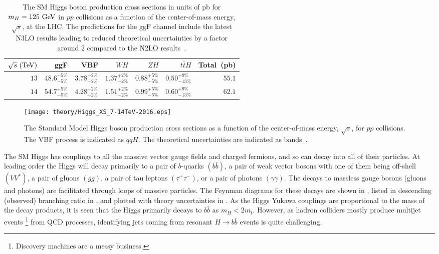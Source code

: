 \begin{table}[htpb]
 \centering
 \caption[The Standard Model Higgs boson production cross sections in units of pb for $m_{H}=125~\GeV$ in $pp$ collisions as a function of the center-of-mass energy, $\sqrt{s}$, at the LHC.]{%
  The SM Higgs boson production cross sections in units of pb for $m_{H}=125~\GeV$ in $pp$ collisions as a function of the center-of-mass energy, $\sqrt{s}$, at the LHC.
  The predictions for the ggF channel include the latest N3LO results leading to reduced theoretical uncertainties by a factor around 2 compared to the N2LO results~\cite{PDG2018:Ch11}.}
 \begin{tabular}{@{}rrrrrrr@{}} \toprule
  $\sqrt{s}~(\mathrm{TeV})$ & ggF                  & VBF                  & $WH$                 & $ZH$                 & $t\bar{t}H$           & Total~(pb) \\ \midrule
  $13$              & $48.6_{-5\%}^{+5\%}$ & $3.78_{-2\%}^{+2\%}$ & $1.37_{-2\%}^{+2\%}$ & $0.88_{-5\%}^{+5\%}$ & $0.50_{-13\%}^{+9\%}$ & $55.1$     \\
  \addlinespace[0.3em]
  $14$              & $54.7_{-5\%}^{+5\%}$ & $4.28_{-2\%}^{+2\%}$ & $1.51_{-2\%}^{+2\%}$ & $0.99_{-5\%}^{+5\%}$ & $0.60_{-13\%}^{+9\%}$ & $62.1$     \\
  \bottomrule
 \end{tabular}\label{table:Higgs_production_cross_section}%
\end{table}

\begin{figure}
 \centering
 \texttt{[image: theory/Higgs\_XS\_7-14TeV-2016.eps]}
 \caption[The Standard Model Higgs boson production cross sections as a function of the center-of-mass energy, $\sqrt{s}$, for $pp$ collisions.]{%
  The Standard Model Higgs boson production cross sections as a function of the center-of-mass energy, $\sqrt{s}$, for $pp$ collisions.
  The VBF process is indicated as $qqH$.
  The theoretical uncertainties are indicated as bands~\cite{PDG2018:Ch11}.}
 \label{fig:Higgs_production_cross_section_theory}
\end{figure}

The SM Higgs has couplings to all the massive vector gauge fields and charged fermions, and so can decay into all of their particles.
At leading order the Higgs will decay primarily to a pair of $b$-quarks $(b\bar{b})$, a pair of weak vector bosons with one of them being off-shell $(VV^{*})$, a pair of gluons $(gg)$, a pair of tau leptons $(\tau^{+}\tau^{-})$, or a pair of photons $(\gamma\gamma)$.
The decays to massless gauge bosons (gluons and photons) are facilitated through loops of massive particles.
The Feynman diagrams for these decays are shown in , listed in descending (observed) branching ratio in , and plotted with theory uncertainties in .
As the Higgs Yukawa couplings are proportional to the mass of the decay products, it is seen that the Higgs primarily decays to $b\bar{b}$ as $m_{H} < 2 m_{t}$.
However, as hadron colliders mostly produce multijet events%
\footnote{Discovery machines are a messy business.}
from QCD processes, identifying jets coming from resonant $H \to b\bar{b}$ events is quite challenging.

